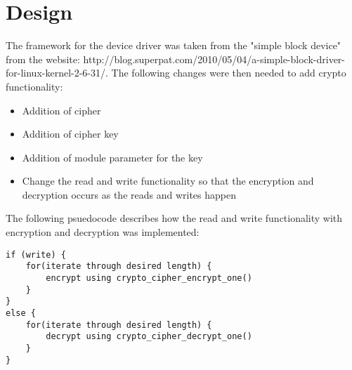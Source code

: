 \section{Design}
The framework for the device driver was taken from the "simple block device" from the website: http://blog.superpat.com/2010/05/04/a-simple-block-driver-for-linux-kernel-2-6-31/. The following changes were then needed to add crypto functionality:
\begin{itemize}
\item Addition of cipher
\item Addition of cipher key
\item Addition of module parameter for the key
\item Change the read and write functionality so that the encryption and decryption occurs as the reads and writes happen
\end{itemize}

The following psuedocode describes how the read and write functionality with encryption and decryption was implemented:
\begin{lstlisting}[lineskip=3pt,keywords={if,else,while}]
if (write) {
	for(iterate through desired length) {
		encrypt using crypto_cipher_encrypt_one()
	}	
}
else {
	for(iterate through desired length) {
		decrypt using crypto_cipher_decrypt_one()
	}	
}		
\end{lstlisting}
